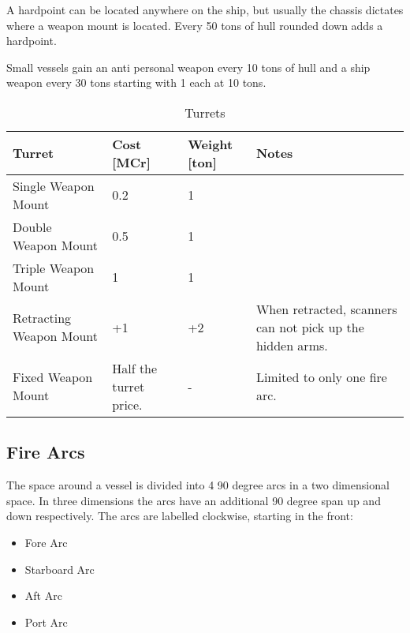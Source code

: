 A hardpoint can be located anywhere on the ship, but usually the chassis dictates where a weapon mount is located. Every 50 tons of hull rounded down adds a hardpoint.

Small vessels gain an anti personal weapon every 10 tons of hull and a ship weapon every 30 tons starting with 1 each at 10 tons.

\begin{table}[H]
  \centering
  \caption{Turrets}
  \begin{tabularx}{\textwidth}{|l|X|p{1.2cm}|X|}
    \hline
    Turret                  & Cost [MCr]             & Weight [ton] & Notes                                                     \\ \hline
    Single Weapon Mount     & 0.2                    & 1             & ~                                                         \\ \hline
    Double Weapon Mount     & 0.5                    & 1             & ~                                                         \\ \hline
    Triple Weapon Mount     & 1                      & 1             & ~                                                         \\ \hline
    Retracting Weapon Mount & +1                     & +2            & When retracted, scanners can not pick up the hidden arms. \\ \hline
    Fixed Weapon Mount      & Half the turret price. & -             & Limited to only one fire arc.                             \\ \hline
  \end{tabularx}
\end{table}

\subsection{Fire Arcs}
\label{sub:Fire Arcs}

The space around a vessel is divided into 4 90 degree arcs in a two dimensional space. In three dimensions the arcs have an additional 90 degree span up and down respectively. The arcs are labelled clockwise, starting in the front:

\begin{itemize}
  \item Fore Arc
  \item Starboard Arc
  \item Aft Arc
  \item Port Arc
\end{itemize}

